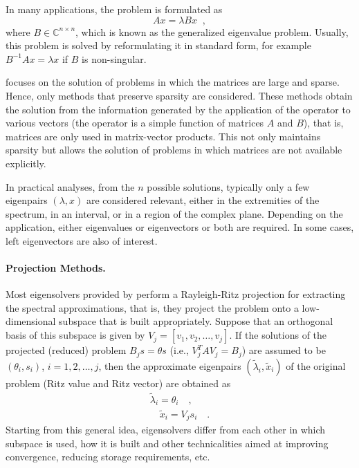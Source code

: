 	In many applications, the problem is formulated as 
\begin{equation}
Ax=\lambda Bx\;\;,\label{eq:eiggen}
\end{equation}
where $B\in\mathbb{C}^{n\times n}$, which is known as the generalized eigenvalue problem. Usually, this problem is solved by reformulating it in standard form, for example $B^{-1}Ax=\lambda x$ if $B$ is non-singular.

	\slepc focuses on the solution of problems in which the matrices are large and sparse. Hence, only methods that preserve sparsity are considered.
	These methods obtain the solution from the information generated by the application of the operator to various vectors (the operator is a simple function of matrices $A$ and $B$), that is, matrices are only used in matrix-vector products. This not only maintains sparsity but allows the solution of problems in which matrices are not available explicitly.

In practical analyses, from the $n$ possible solutions, typically only a few eigenpairs $(\lambda,x)$ are considered relevant, either in the extremities of the spectrum, in an interval, or in a region of the complex plane.
Depending on the application, either eigenvalues or eigenvectors or both are required. In some cases, left eigenvectors are also of interest.
	
\paragraph{Projection Methods.}

	Most eigensolvers provided by \slepc perform a Rayleigh-Ritz projection for extracting the spectral approximations, that is, they project the problem onto a low-dimensional subspace that is built appropriately. Suppose that an orthogonal basis of this subspace is given by $V_j=[v_1,v_2,\ldots,v_j]$. If the solutions of the projected (reduced) problem $B_js=\theta s$ (i.e., $V_j^TAV_j=B_j$) are assumed to be $(\theta_i,s_i)$, $i=1,2,\ldots,j$, then the approximate eigenpairs $(\tilde{\lambda}_i,\tilde{x}_i)$ of the original problem (Ritz value and Ritz vector) are obtained as
\begin{eqnarray}
\tilde{\lambda}_i=\theta_i\quad,\\
\quad\tilde{x}_i=V_js_i\quad.
\end{eqnarray}
Starting from this general idea, eigensolvers differ from each other in which subspace is used, how it is built and other technicalities aimed at improving convergence, reducing storage requirements, etc.

